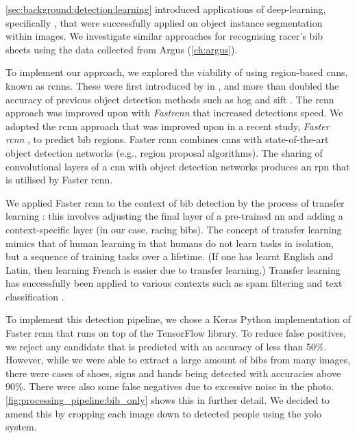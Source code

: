 \def \frcnn {Faster \gls{rcnn}}

\cref{sec:background:detection:learning} introduced applications of deep-learning, specifically , that were successfully applied on object instance segmentation within images. We investigate similar approaches for recognising racer's bib sheets using the data collected from Argus  (\cref{ch:argus}).

To implement our approach, we explored the viability of using region-based \glspl{cnn}, known as \glspl{rcnn}. These were first introduced by \citet{Girshick:2014jx} in \citeyear{Girshick:2014jx}, and more than doubled the accuracy of previous object detection methods such as \gls{hog} \citep{Dalal:2005jq} and \gls{sift} \citep{Lowe:2004kp}. The \gls{rcnn} approach was improved upon with \textit{Fast\gls{rcnn}} \citep{Girshick:2015vr} that increased detections speed. We adopted the \gls{rcnn} approach that was improved upon in a  recent \citeyear{Ren:2017ug} study, \textit{\frcnn{}} \citep{Ren:2017ug}, to predict bib regions. \frcnn{} combines \glspl{cnn} with state-of-the-art object detection networks (e.g., region proposal algorithms). The sharing of convolutional layers of a \gls{cnn} with object detection networks produces an \gls{rpn} that is utilised by \frcnn{}.

We applied \frcnn{} to the context of bib detection by the process of transfer learning \cite{Caruana:1997wk,Thrun:1996wh,Baxter:1997wr}: this involves adjusting the final layer of a pre-trained \gls{nn} and adding a context-specific layer (in our case, racing bibs). The concept of transfer learning mimics that of human learning in that humans do not learn tasks in isolation, but a sequence of training tasks over a lifetime. (If one has learnt English and Latin, then learning French is easier due to transfer learning.) Transfer learning has successfully been applied to various contexts such as spam filtering \citep{Bickel:2006ul} and text classification \citep{Raina:2006tv, Do:2005uz}.

To implement this detection pipeline, we chose a Keras \citep{chollet2015keras} Python implementation of \frcnn{} that runs on top of the TensorFlow \citep{tensorflow2015-whitepaper} library. To reduce false positives, we reject any candidate that is predicted with an accuracy of less than 50\%. However, while we were able to extract a large amount of bibs from many images, there were cases of shoes, signs and hands being detected with accuracies above 90\%. There were also some false negatives due to excessive noise in the photo. \cref{fig:processing_pipeline:bib_only} shows this in further detail. We decided to amend this by cropping each image down to detected people using the \gls{yolo} system.

